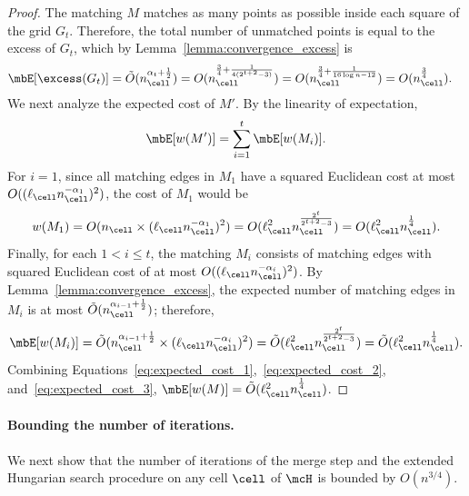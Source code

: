 \begin{proof}
    The matching $M$ matches as many points as possible inside each square of the grid $G_t$. Therefore, the total number of unmatched points is equal to the excess of $G_t$, which by Lemma~\ref{lemma:convergence_excess} is 
    \begin{align}
        \mbE[\excess(G_t)] &= \tilde{O}(n_\cell^{\alpha_t+\frac{1}{2}}) = O(n_\cell^{\frac{3}{4}+\frac{1}{4(2^{t+2}-3)}}) = O(n_\cell^{\frac{3}{4}+\frac{1}{16\log n-12}}) = O(n_\cell^{\frac{3}{4}}).
    \end{align}
    We next analyze the expected cost of $M'$. By the linearity of expectation,
    \begin{equation}
        \mbE[w(M')] = \sum_{i=1}^t \mbE[w(M_i)].
        \label{eq:expected_cost_1}
    \end{equation}
    For $i=1$, since all matching edges in $M_1$ have a squared Euclidean cost at most $O((\ell_\cell n_\cell^{-\alpha_1})^2)$, the cost of $M_1$ would be 
    \begin{equation}
        w(M_1) = O(n_\cell\times (\ell_\cell n_\cell^{-\alpha_1})^2) = O(\ell_\cell^2 n_\cell^{\frac{2^t}{2^{t+2}-3}}) = O(\ell_\cell^2 n_\cell^{\frac{1}{4}}).\label{eq:expected_cost_2}
    \end{equation}
    Finally, for each $1<i\le t$, the matching $M_i$ consists of matching edges with squared Euclidean cost of at most $O((\ell_\cell n_\cell^{-\alpha_i})^2)$. By Lemma~\ref{lemma:convergence_excess}, the expected number of matching edges in $M_i$ is at most $\tilde{O}(n_\cell^{\alpha_{i-1}+\frac{1}{2}})$; therefore,
    \begin{equation}
        \mbE[w(M_i)] = \tilde{O}(n_\cell^{\alpha_{i-1}+\frac{1}{2}}\times (\ell_\cell n_\cell^{-\alpha_i})^2) = \tilde{O}(\ell_\cell^2 n_\cell^{\frac{2^t}{2^{t+2}-3}}) = \tilde{O}(\ell_\cell^2 n_\cell^{\frac{1}{4}}).\label{eq:expected_cost_3}
    \end{equation}
    Combining Equations~\eqref{eq:expected_cost_1},~\eqref{eq:expected_cost_2}, and~\eqref{eq:expected_cost_3}, $\mbE[w(M)] = \tilde{O}(\ell_\cell^2 n_\cell^{\frac{1}{4}})$.
\end{proof}

\paragraph{Bounding the number of iterations.} We next show that the number of iterations of the merge step and the extended Hungarian search procedure on any cell $\cell$ of $\mcH$ is bounded by $O(n^{3/4})$.


